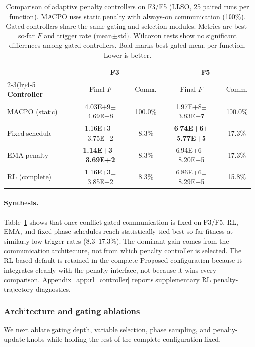 \documentclass[conference]{IEEEtran}
\begin{document}
\begin{table}[!t]
\centering
\scriptsize
\caption{Comparison of adaptive penalty controllers on F3/F5 (LLSO, 25 paired runs per function). MACPO uses static penalty with always-on communication (100\%). Gated controllers share the same gating and selection modules. Metrics are best-so-far $F$ and trigger rate (mean$\pm$std). Wilcoxon tests show no significant differences among gated controllers. Bold marks best gated mean per function. Lower is better.}
\label{tab:penalty_controller_f3_f5}
\setlength{\tabcolsep}{5pt}
\begin{tabular}{@{}lcc|cc@{}}
\toprule
& \multicolumn{2}{c|}{\textbf{F3}} & \multicolumn{2}{c}{\textbf{F5}} \\
\cmidrule(lr){2-3}\cmidrule(lr){4-5}
\textbf{Controller} & Final $F$ & Comm. & Final $F$ & Comm. \\
\midrule
MACPO (static) & 4.03E+9{$\pm$4.69E+8} & 100.0\% & 1.97E+8{$\pm$3.83E+7} & 100.0\% \\
Fixed schedule & 1.16E+3{$\pm$3.75E+2} & 8.3\% & \textbf{6.74E+6{$\pm$5.77E+5}} & 17.3\% \\
EMA penalty & \textbf{1.14E+3{$\pm$3.69E+2}} & 8.3\% & 6.94E+6{$\pm$8.20E+5} & 17.3\% \\
RL (complete) & 1.16E+3{$\pm$3.85E+2} & 8.3\% & 6.86E+6{$\pm$8.29E+5} & 15.8\% \\
\bottomrule
\end{tabular}
\end{table}

\paragraph{Synthesis.} Table~\ref{tab:penalty_controller_f3_f5} shows that once conflict-gated communication is fixed on F3/F5, RL, EMA, and fixed phase schedules reach statistically tied best-so-far fitness at similarly low trigger rates (8.3--17.3\%). The dominant gain comes from the communication architecture, not from which penalty controller is selected. The RL-based default is retained in the complete Proposed configuration because it integrates cleanly with the penalty interface, not because it wins every comparison. Appendix~\ref{app:rl_controller} reports supplementary RL penalty-trajectory diagnostics.

\subsubsection{Architecture and gating ablations}\label{sec:q3_modules}
We next ablate gating depth, variable selection, phase sampling, and penalty-update knobs while holding the rest of the complete configuration fixed.
\end{document}
